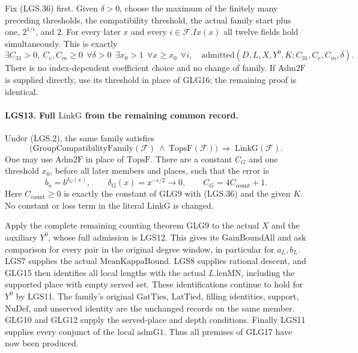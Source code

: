 Fix (LGS.36) first.  Given \(\delta>0\), choose the
maximum of the finitely many preceding thresholds,
the compatibility threshold, the actual family start
plus one, \(2^{1/\epsilon}\), and \(2\).
For every later \(x\) and every \(i\in\mathcal F.Ix(x)\)
all twelve fields hold simultaneously.  This is
exactly
\[
 \exists C_{31}>0,\ C_e,C_m\ge0\
 \ \forall\delta>0\
 \ \exists x_0>1\
 \ \forall x\ge x_0\
 \ \forall i,\quad
             \mathrm{admitted}(D,L,X,Y^0,K;
                                      C_{31},C_e,C_m,\delta).
                                                               \tag{LGS.37}
\]
There is no index-dependent coefficient choice and
no change of family.  If \(\mathrm{Adm2F}\) is supplied
directly, use its threshold in place of GLG16; the
remaining proof is identical.

\paragraph{LGS13. Full \(\mathrm{LinkG}\) from the remaining common record.}
\label{claim:LGS13}
Under (LGS.2), the same family satisfies
\[
 \bigl(\mathrm{GroupCompatibilityFamily}(\mathcal F)
       \ \wedge\ \mathrm{TopsF}(\mathcal F)\bigr)
               \ \Longrightarrow\ \mathrm{LinkG}(\mathcal F).
                                                               \tag{LGS.38}
\]
One may use \(\mathrm{Adm2F}\) in place of
\(\mathrm{TopsF}\).  There are a constant \(C_G\) and
one threshold \(x_0\), before all later members and
places, such that the error is
\[
           b_o=b^{\delta_G(x)},\qquad
           \delta_G(x)=x^{-\epsilon/2}\longrightarrow0,
           \qquad C_G=4C_{\mathrm{count}}+1.          \tag{LGS.39}
\]
Here \(C_{\mathrm{count}}\ge0\) is exactly the
constant of GLG9 with (LGS.36) and the given \(K\).
No constant or loss term in the literal \(\mathrm{LinkG}\)
is changed.

Apply the complete remaining counting theorem GLG9
to the actual \(X\) and the auxiliary \(Y^0\), whose
full admission is LGS12.  This gives its
\(\mathrm{GainBoundAll}\) and ask comparison for
every pair in the original degree window, in
particular for \(a_L,b_L\).
LGS7 supplies the actual \(\mathrm{MeanKappaBound}\).
LGS8 supplies rational descent, and GLG15 then
identifies all local lengths with the actual
\(L.\mathrm{lenMN}\), including the supported place
with empty served set.  These identifications
continue to hold for \(Y^0\) by LGS11.
The family's original \(\mathrm{GatTies}\),
\(\mathrm{LatTied}\), filling identities, support,
\(\mathrm{NuDef}\), and unserved identity are the
unchanged records on the same member.
GLG10 and GLG12 supply the served-place and depth
conditions.  Finally LGS11 supplies every conjunct
of the local \(\mathrm{admG1}\).
Thus all premises of GLG17 have now been produced.

